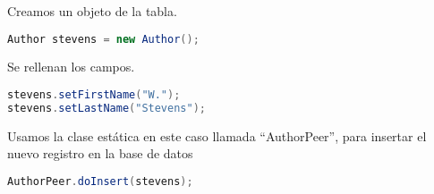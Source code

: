 Creamos un objeto de la tabla.

\begin{lstlisting}[language=Java]
Author stevens = new Author();
\end{lstlisting}

Se rellenan los campos.

\begin{lstlisting}[language=Java]
stevens.setFirstName("W.");
stevens.setLastName("Stevens");
\end{lstlisting}

Usamos la clase estática en este caso llamada “AuthorPeer”, para insertar el nuevo registro en la base de datos

\begin{lstlisting}[language=Java]
AuthorPeer.doInsert(stevens);
\end{lstlisting}